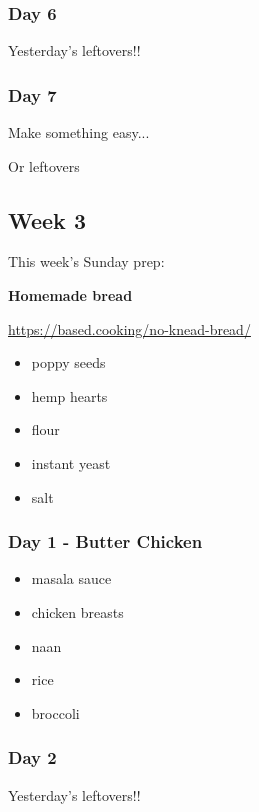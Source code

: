 \documentclass[11pt, a4paper]{article}
\begin{document}
\subsubsection{Day 6}
\vspace{1pc}
Yesterday's leftovers!!

\subsubsection{Day 7}
\vspace{1pc}
\noindent Make something easy...
\par
Or leftovers


\vspace{0.917 pc} %


\pagebreak
\subsection{Week 3}

This week's Sunday prep:
\par
\vspace{1pc}
\noindent\textbf{Homemade bread}
\par
\small{\url{https://based.cooking/no-knead-bread/}}
\begin{itemize}
\item poppy seeds
\item hemp hearts
\item flour
\item instant yeast
\item salt
\end{itemize}

\subsubsection{Day 1 - Butter Chicken}
\vspace{1pc}
\begin{itemize}
\item masala sauce
\item chicken breasts
\item naan
\item rice
\item broccoli
\end{itemize}

\subsubsection{Day 2}
\vspace{1pc}
Yesterday's leftovers!!
\end{document}
